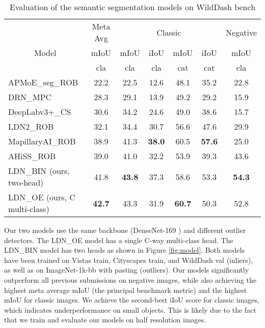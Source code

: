 \documentclass[runningheads]{llncs}
\begin{document}
\setlength{\tabcolsep}{4pt}
\begin{table}[htb!]
\begin{center}
\caption{Evaluation of the semantic segmentation
        models on WildDash bench}
\label{table:bench_results}
\begin{tabular}{|c||c|cccc|c|}
  \hline
  & \multicolumn{1}{c|}{Meta Avg}  
  & \multicolumn{4}{c|}{Classic} 
  & \multicolumn{1}{c|}{Negative}
\\
  \cline{2-7}
  Model
  & mIoU
  & mIoU
  & iIoU
  & mIoU
  & iIoU
  & mIoU\\
 &cla &cla&cla &cat&cat&cla\\
 \hline
 \hline
  \multicolumn{1}{|l||}{APMoE\_seg\_ROB \cite{kong2018pag}} & 22.2 & 22.5 & 12.6 & 48.1 & 35.2 & 22.8\\
  \hline
  \multicolumn{1}{|l||}{DRN\_MPC \cite{Yu2017}} & 28.3 & 29.1 & 13.9 & 49.2 & 29.2 & 15.9 \\
  \hline
  \multicolumn{1}{|l||}{DeepLabv3+\_CS \cite{chen2018encoder}} & 30.6 & 34.2 & 24.6 & 49.0 & 38.6 & 15.7\\ 
  \hline
  \multicolumn{1}{|l||}{LDN2\_ROB \cite{kreso18arxiv}} & 32.1 & 34.4 & 30.7 & 56.6 & 47.6 & 29.9\\
  \hline
  \multicolumn{1}{|l||}{MapillaryAI\_ROB \cite{bulo2017place}} &38.9 & 41.3 & \textbf{38.0} & 60.5 & \textbf{57.6} & 25.0\\
  \hline
  \multicolumn{1}{|l||}{AHiSS\_ROB \cite{meletis2018training}} & 39.0 & 41.0 & 32.2 & 53.9 & 39.3 & 43.6\\
  \hline
  \hline
  \multicolumn{1}{|l||}{LDN\_BIN 
    (ours, two-head)} & 
    41.8 & \textbf{43.8} & 
    37.3 & 58.6 & 53.3 & \textbf{54.3}\\
  \hline
  \multicolumn{1}{|l||}{LDN\_OE 
    (ours, C multi-class)} &
    \textbf{42.7} & 43.3 & 
    31.9 & \textbf{60.7} & 50.3 & 52.8\\
\hline
\end{tabular}
\end{center}
\end{table}



Our two models use the same backbone
(DenseNet-169 \cite{huang17cvpr})
and different outlier detectors.
The LDN\_OE model has 
a single C-way multi-class head.
The LDN\_BIN model has two heads
as shown in Figure \ref{fig:model}. 
Both models have been trained on
Vistas train, Cityscapes train, 
and WildDash val (inliers),
as well as on ImageNet-1k-bb 
with pasting (outliers).
Our models significantly outperform
all previous submissions on negative images,
while also achieving the highest 
meta average mIoU
(the principal benchmark metric)
and the highest mIoU for classic images.
We achieve the second-best iIoU score 
for classic images, which indicates 
underperformance on small objects. 
This is likely due to the fact that
we train and evaluate our models 
on half resolution images. 
\end{document}
